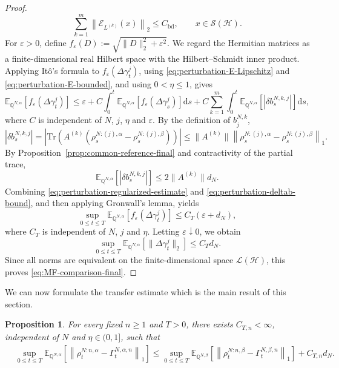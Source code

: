 \documentclass[10pt,a4paper,reqno]{amsart}
\numberwithin{equation}{section}
\theoremstyle{plain}
\newtheorem{proposition}[theorem]{Proposition}
\theoremstyle{definition}
\theoremstyle{remark}
\renewcommand{\d}{\mathrm d}
\newcommand{\Tr}{\mathrm{Tr}}
\newcommand{\E}{\mathbb E}
\newcommand{\Q}{\mathbb Q}
\newcommand{\cS}{\mathcal S}
\newcommand{\cL}{\mathcal L}
\newcommand{\cE}{\mathcal E}
\newcommand{\HH}{\mathcal H}
\newcommand{\1}{\mathbf 1}
\begin{document}
\begin{proof}
\begin{equation}
  \sum_{k=1}^m\left\|\cE_{L^{(k)}}(x)\right\|_2\le C_{\mathrm{bd}},\qquad x\in\cS(\HH).
  \label{eq:perturbation-E-bounded}
\end{equation}
For \(\varepsilon>0\), define \(f_\varepsilon(D):=\sqrt{\|D\|_2^2+\varepsilon^2}\).  We regard the Hermitian matrices as a finite-dimensional real Hilbert space with the Hilbert--Schmidt inner product.  Applying It\^o's formula to \(f_\varepsilon(\Delta\gamma_t^j)\), using \eqref{eq:perturbation-E-Lipschitz} and \eqref{eq:perturbation-E-bounded}, and using \(0<\eta\le1\), gives
\begin{equation}
  \E_{\Q^{N,\alpha}}\left[f_\varepsilon(\Delta\gamma_t^j)\right]\le\varepsilon+C\int_0^t\E_{\Q^{N,\alpha}}\left[f_\varepsilon(\Delta\gamma_s^j)\right]\d s+C\sum_{k=1}^m\int_0^t\E_{\Q^{N,\alpha}}\left[|\delta b_s^{N,k,j}|\right]\d s,
  \label{eq:perturbation-regularized-estimate}
\end{equation}
where \(C\) is independent of \(N\), \(j\), \(\eta\) and \(\varepsilon\).  By the definition of \(b_j^{N,k}\),
\[
  |\delta b_s^{N,k,j}|=\left|\Tr\left(A^{(k)}\left(\rho_s^{N:(j),\alpha}-\rho_s^{N:(j),\beta}\right)\right)\right|\le\|A^{(k)}\|\left\|\rho_s^{N:(j),\alpha}-\rho_s^{N:(j),\beta}\right\|_1.
\]
By Proposition~\ref{prop:common-reference-final} and contractivity of the partial trace,
\begin{equation}
  \E_{\Q^{N,\alpha}}\left[|\delta b_s^{N,k,j}|\right]\le2\|A^{(k)}\|d_N.
  \label{eq:perturbation-deltab-bound}
\end{equation}
Combining \eqref{eq:perturbation-regularized-estimate} and \eqref{eq:perturbation-deltab-bound}, and then applying Gronwall's lemma, yields
\[
  \sup_{0\le t\le T}\E_{\Q^{N,\alpha}}\left[f_\varepsilon(\Delta\gamma_t^j)\right]\le C_T(\varepsilon+d_N),
\]
where \(C_T\) is independent of \(N\), \(j\) and \(\eta\).  Letting \(\varepsilon\downarrow0\), we obtain
\[
  \sup_{0\le t\le T}\E_{\Q^{N,\alpha}}\left[\|\Delta\gamma_t^j\|_2\right]\le C_Td_N.
\]
Since all norms are equivalent on the finite-dimensional space \(\cL(\HH)\), this proves \eqref{eq:MF-comparison-final}.
\end{proof}

  
  
  
  

We can now formulate the transfer estimate which is the main result of this
section.

\begin{proposition}
\label{prop:uniform-transfer-final}
For every fixed \(n\ge1\) and \(T>0\), there exists
\(C_{T,n}<\infty\), independent of \(N\) and
\(\eta\in(0,1]\), such that
\begin{equation}
\begin{aligned}
  &\sup_{0\le t\le T}
  \E_{\Q^{N,\alpha}}
  \left[
    \left\|
      \rho_t^{N:n,\alpha}
      -
      \Gamma_t^{N,\alpha,n}
    \right\|_1
  \right] \le
  \sup_{0\le t\le T}
  \E_{\Q^{N,\beta}}
  \left[
    \left\|
      \rho_t^{N:n,\beta}
      -
      \Gamma_t^{N,\beta,n}
    \right\|_1
  \right]
  +
  C_{T,n}d_N.
\end{aligned}
  \label{eq:uniform-transfer-final}
\end{equation}
\end{proposition}
\end{document}
